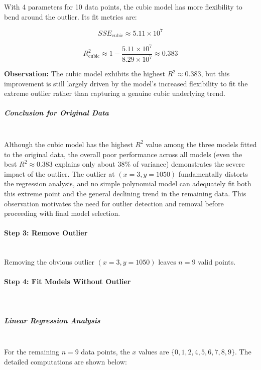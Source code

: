 With 4 parameters for 10 data points, the cubic model has more flexibility to bend around the outlier. Its fit metrics are:

\[
SSE_{\text{cubic}} \approx 5.11 \times 10^7
\]

\[
R^2_{\text{cubic}} \approx 1 - \frac{5.11 \times 10^7}{8.29 \times 10^7} \approx 0.383
\]

\textbf{Observation:} The cubic model exhibits the highest $R^2 \approx 0.383$, but this improvement is still largely driven by the model's increased flexibility to fit the extreme outlier rather than capturing a genuine cubic underlying trend.

\subparagraph{Conclusion for Original Data} \mbox{} \\
Although the cubic model has the highest $R^2$ value among the three models fitted to the original data, the overall poor performance across all models (even the best $R^2 \approx 0.383$ explains only about 38\% of variance) demonstrates the severe impact of the outlier. The outlier at $(x=3, y=1050)$ fundamentally distorts the regression analysis, and no simple polynomial model can adequately fit both this extreme point and the general declining trend in the remaining data. This observation motivates the need for outlier detection and removal before proceeding with final model selection.

\paragraph{Step 3: Remove Outlier} \mbox{} \\
Removing the obvious outlier $(x=3, y=1050)$ leaves $n=9$ valid points.

\paragraph{Step 4: Fit Models Without Outlier} \mbox{} \\
\subparagraph{Linear Regression Analysis} \mbox{} \\
For the remaining $n = 9$ data points, the $x$ values are $\{0, 1, 2, 4, 5, 6, 7, 8, 9\}$. The detailed computations are shown below:

